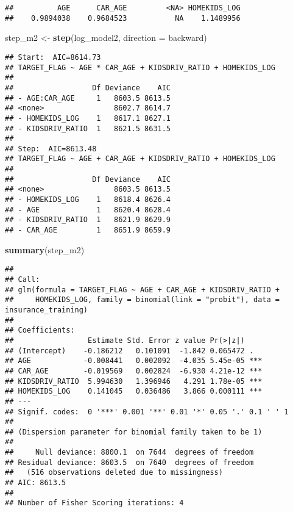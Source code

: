 \documentclass[
]{article}
\newenvironment{Shaded}{\begin{snugshade}}{\end{snugshade}}
\newcommand{\AttributeTok}[1]{\textcolor[rgb]{0.13,0.29,0.53}{#1}}
\newcommand{\FunctionTok}[1]{\textcolor[rgb]{0.13,0.29,0.53}{\textbf{#1}}}
\newcommand{\NormalTok}[1]{#1}
\newcommand{\OtherTok}[1]{\textcolor[rgb]{0.56,0.35,0.01}{#1}}
\newcommand{\StringTok}[1]{\textcolor[rgb]{0.31,0.60,0.02}{#1}}
\begin{document}
\begin{verbatim}
##          AGE      CAR_AGE         <NA> HOMEKIDS_LOG 
##    0.9894038    0.9684523           NA    1.1489956
\end{verbatim}

\begin{Shaded}
\begin{Highlighting}[]
\NormalTok{step\_m2 }\OtherTok{\textless{}{-}} \FunctionTok{step}\NormalTok{(log\_model2, }\AttributeTok{direction =} \StringTok{\textquotesingle{}backward\textquotesingle{}}\NormalTok{)}
\end{Highlighting}
\end{Shaded}

\begin{verbatim}
## Start:  AIC=8614.73
## TARGET_FLAG ~ AGE * CAR_AGE + KIDSDRIV_RATIO + HOMEKIDS_LOG
## 
##                  Df Deviance    AIC
## - AGE:CAR_AGE     1   8603.5 8613.5
## <none>                8602.7 8614.7
## - HOMEKIDS_LOG    1   8617.1 8627.1
## - KIDSDRIV_RATIO  1   8621.5 8631.5
## 
## Step:  AIC=8613.48
## TARGET_FLAG ~ AGE + CAR_AGE + KIDSDRIV_RATIO + HOMEKIDS_LOG
## 
##                  Df Deviance    AIC
## <none>                8603.5 8613.5
## - HOMEKIDS_LOG    1   8618.4 8626.4
## - AGE             1   8620.4 8628.4
## - KIDSDRIV_RATIO  1   8621.9 8629.9
## - CAR_AGE         1   8651.9 8659.9
\end{verbatim}

\begin{Shaded}
\begin{Highlighting}[]
\FunctionTok{summary}\NormalTok{(step\_m2)}
\end{Highlighting}
\end{Shaded}

\begin{verbatim}
## 
## Call:
## glm(formula = TARGET_FLAG ~ AGE + CAR_AGE + KIDSDRIV_RATIO + 
##     HOMEKIDS_LOG, family = binomial(link = "probit"), data = insurance_training)
## 
## Coefficients:
##                 Estimate Std. Error z value Pr(>|z|)    
## (Intercept)    -0.186212   0.101091  -1.842 0.065472 .  
## AGE            -0.008441   0.002092  -4.035 5.45e-05 ***
## CAR_AGE        -0.019569   0.002824  -6.930 4.21e-12 ***
## KIDSDRIV_RATIO  5.994630   1.396946   4.291 1.78e-05 ***
## HOMEKIDS_LOG    0.141045   0.036486   3.866 0.000111 ***
## ---
## Signif. codes:  0 '***' 0.001 '**' 0.01 '*' 0.05 '.' 0.1 ' ' 1
## 
## (Dispersion parameter for binomial family taken to be 1)
## 
##     Null deviance: 8800.1  on 7644  degrees of freedom
## Residual deviance: 8603.5  on 7640  degrees of freedom
##   (516 observations deleted due to missingness)
## AIC: 8613.5
## 
## Number of Fisher Scoring iterations: 4
\end{verbatim}
\end{document}

